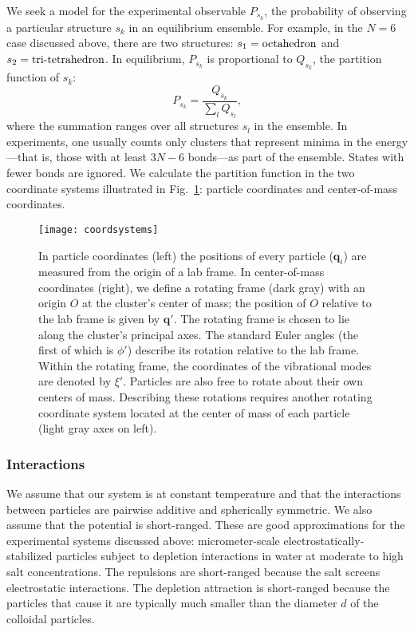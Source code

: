 \documentclass[pre, aps, twocolumn, reprint, amsmath,amssymb, showpacs,
superscriptaddress] {revtex4-1}
\begin{document}
We seek a model for the experimental observable $P_{s_k}$, the
probability of observing a particular structure $s_k$ in an equilibrium
ensemble. For example, in the $N=6$ case discussed above, there are two
structures: $s_1=\textnormal{octahedron}$ and
$s_2=\textnormal{tri-tetrahedron}$. In equilibrium, $P_{s_k}$ is
proportional to $Q_{s_k}$, the partition function of $s_k$: 
\begin{equation}
	P_{s_k} = \frac{Q_{s_k}}{\sum_{l}{Q_{s_l}}},
  \label{eq:cluster_probability}
\end{equation}
where the summation ranges over all structures $s_l$ in the ensemble. In
experiments, one usually counts only clusters that represent minima in
the energy---that is, those with at least $3N-6$ bonds---as part of the
ensemble. States with fewer bonds are ignored. We calculate the
partition function in the two coordinate systems illustrated in
Fig.~\ref{fig:CoordSystems}: particle coordinates and center-of-mass
coordinates.

\begin{figure}
	\begin{centering}
    \texttt{[image: coordsystems]}
    \caption{In particle coordinates (left) the positions of every
      particle ($\mathbf{q}_i$) are measured from the origin of a lab
      frame. In center-of-mass coordinates (right), we define a rotating
      frame (dark gray) with an origin $O$ at the cluster's center of
      mass; the position of $O$ relative to the lab frame is given by
      $\mathbf{q'}$. The rotating frame is chosen to lie along the
      cluster's principal axes. The standard Euler angles (the first of
      which is $\phi'$) describe its rotation relative to the lab frame.
      Within the rotating frame, the coordinates of the vibrational
      modes are denoted by $\xi'$. Particles are also free to rotate
      about their own centers of mass. Describing these rotations
      requires another rotating coordinate system located at the center
      of mass of each particle (light gray axes on left).
      \label{fig:CoordSystems}}
	\end{centering}
\end{figure}

\subsubsection{Interactions}

We assume that our system is at constant temperature and that the
interactions between particles are pairwise additive and spherically
symmetric. We also assume that the potential is short-ranged. These are
good approximations for the experimental systems discussed above:
micrometer-scale electrostatically-stabilized particles subject to
depletion interactions in water at moderate to high salt concentrations.
The repulsions are short-ranged because the salt screens electrostatic
interactions. The depletion attraction is short-ranged because the
particles that cause it are typically much smaller than the diameter $d$
of the colloidal particles.
\end{document}
